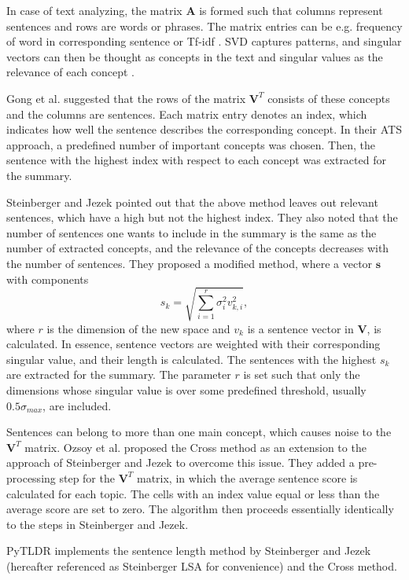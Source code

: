\documentclass[conference]{IEEEtran}
\begin{document}
In case of text analyzing, the matrix $\mathbf{A}$ is formed such that columns represent sentences and rows are words or phrases. The matrix entries can be e.g. frequency of word in corresponding sentence or Tf-idf \cite{ozsoy2011}. SVD captures patterns, and singular vectors can then be thought as concepts in the text and singular values as the relevance of each concept \cite{gong2001}. 

Gong et al. \cite{gong2001} suggested that the rows of the matrix $\mathbf{V}^T$ consists of these concepts and the columns are sentences. Each matrix entry denotes an index, which indicates how well the sentence describes the corresponding concept. In their ATS approach, a predefined number of important concepts was chosen. Then, the sentence with the highest index with respect to each concept was extracted for the summary.

Steinberger and Jezek \cite{steinberger2004} pointed out that the above method leaves out relevant sentences, which have a high but not the highest index. They also noted that the number of sentences one wants to include in the summary is the same as the number of extracted concepts, and the relevance of the concepts decreases with the number of sentences. They proposed a modified method, where a vector $\mathbf{s}$ with components
\begin{equation}
s_k = \sqrt{\sum \limits_{i=1}^{r} \sigma_i^2 v_{k,i}^2},
\end{equation}
where $r$ is the dimension of the new space and $v_k$ is a sentence vector in $\mathbf{V}$, is calculated. In essence, sentence vectors are weighted with their corresponding singular value, and their length is calculated. The sentences with the highest $s_k$ are extracted for the summary. The parameter $r$ is set such that only the dimensions whose singular value is over some predefined threshold, usually $0.5 \sigma_{max}$, are included.

Sentences can belong to more than one main concept, which causes noise to the $\mathbf{V}^T$ matrix. Ozsoy et al. \cite{ozsoy2010} proposed the Cross method as an extension to the approach of Steinberger and Jezek to overcome this issue. They added a pre-processing step for the $\mathbf{V}^T$ matrix, in which the average sentence score is calculated for each topic. The cells with an index value equal or less than the average score are set to zero. The algorithm then proceeds essentially identically to the steps in Steinberger and Jezek.

PyTLDR implements the sentence length method by Steinberger and Jezek (hereafter referenced as Steinberger LSA for convenience) and the Cross method.%
\end{document}
